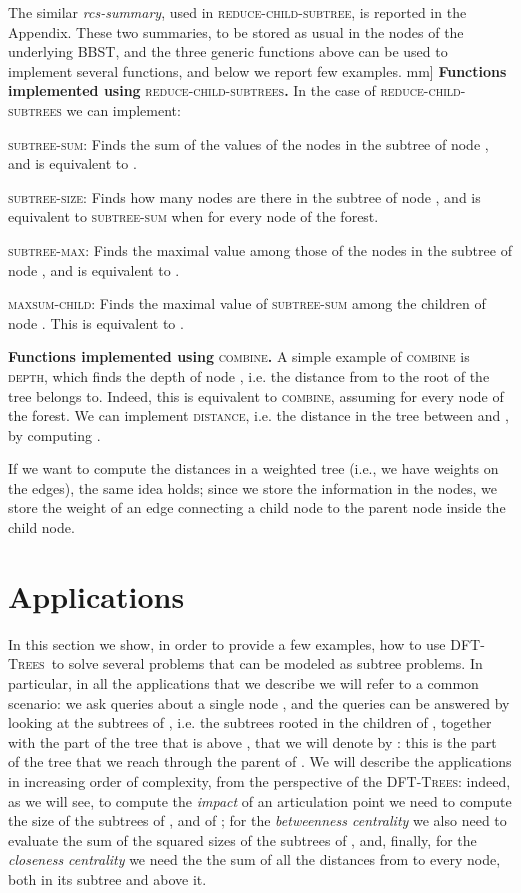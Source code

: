 \documentclass[a4paper,USenglish]{lipics}
\newcommand{\dfts}{\textsc{DFT-Trees}}
\begin{document}
The similar \emph{rcs-summary}, used in \textsc{reduce-child-subtree}, is reported in the Appendix. These two summaries, to be stored as usual in the nodes of the underlying BBST, and the three generic functions above can be used to implement several functions, and below we report few examples.
\4mm]
\noindent\textbf{\textsf{Functions implemented using}} \textsc{reduce-child-subtrees}\textbf{.}\quad
In the case of \textsc{reduce-child-subtrees} we can implement:
		\begin{compactitem}
			\item \textsc{subtree-sum}: Finds the sum of the values of the nodes in the subtree of node , and is equivalent to .
			\item \textsc{subtree-size}: Finds how many nodes are there in the subtree of node , and is equivalent to \textsc{subtree-sum} when  for every node  of the forest.
		 	\item \textsc{subtree-max}: Finds the maximal value among those of the nodes in the subtree of node , and is equivalent to .
			\item \textsc{maxsum-child}: Finds the maximal value of \textsc{subtree-sum} among the children of node . This is equivalent to . 	
		\end{compactitem}
\vspace{4mm}
\noindent\textbf{\textsf{Functions implemented using}} \textsc{combine}\textbf{.}\quad 		
		A simple example of \textsc{combine} is \textsc{depth}, which finds the depth of node , i.e. the distance from  to the root of the tree  belongs to. Indeed, this is equivalent to \textsc{combine}, assuming  for every node  of the forest. We can implement \textsc{distance}, i.e. the distance in the tree between  and , by computing .


If we want to compute the distances in a weighted tree (i.e., we have weights on the edges), the same idea holds; since we store the information in the nodes, we store the weight of an edge connecting a child node to the parent node inside the child node. 

\section{Applications}
\label{sec:applications}
In this section we show, in order to provide a few examples, how to use \dfts\ to solve several problems that can be modeled as subtree problems. In particular, in all the applications that we describe we will refer to a common scenario: we ask queries about a single node , and the queries can be answered by looking at the subtrees of , i.e. the subtrees rooted in the children of , together with the part of the tree that is above , that we will denote by : this is the part of the tree that we reach through the parent of . We will describe the applications in increasing order of complexity, from the perspective of the \dfts: indeed, as we will see, to compute the \emph{impact} of an articulation point  we need to compute the size of the subtrees of , and of ; for the \emph{betweenness centrality} we also need to evaluate the sum of the squared sizes of the subtrees of , and, finally, for the \emph{closeness centrality} we need the the sum of all the distances from  to every node, both in its subtree and above it. 
\end{document}
